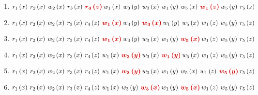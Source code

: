 \documentclass[a4paper]{article}
\begin{document}
\begin{enumerate}
		\item $r_{1}\left(x\right) \: r_{2}\left(x\right) \: w_{2}\left(x\right) \: r_{3}\left(x\right) \: \textcolor{Red3}{\boldsymbol{r_{4}\left(z\right)} \: }w_{1}\left(x\right) \: w_{3}\left(y\right) \: w_{3}\left(x\right) \: w_{1}\left(y\right) \: w_{5}\left(x\right) \: \textcolor{Red3}{\boldsymbol{w_{1}\left(z\right)} \: }w_{5}\left(y\right) \: r_{5}\left(z\right)$
		
		\item $r_{1}\left(x\right) \: r_{2}\left(x\right) \: w_{2}\left(x\right) \: r_{3}\left(x\right) \: r_{4}\left(z\right) \: \textcolor{Red3}{\boldsymbol{w_{1}\left(x\right)} \: }w_{3}\left(y\right) \: \textcolor{Red3}{\boldsymbol{w_{3}\left(x\right)} \: }w_{1}\left(y\right) \: w_{5}\left(x\right) \: w_{1}\left(z\right) \: w_{5}\left(y\right) \: r_{5}\left(z\right)$
		
		\item $r_{1}\left(x\right) \: r_{2}\left(x\right) \: w_{2}\left(x\right) \: r_{3}\left(x\right) \: r_{4}\left(z\right) \: \textcolor{Red3}{\boldsymbol{w_{1}\left(x\right)} \: }w_{3}\left(y\right) \: w_{3}\left(x\right) \: w_{1}\left(y\right) \: \textcolor{Red3}{\boldsymbol{w_{5}\left(x\right)} \: }w_{1}\left(z\right) \: w_{5}\left(y\right) \: r_{5}\left(z\right)$
		
		\item $r_{1}\left(x\right) \: r_{2}\left(x\right) \: w_{2}\left(x\right) \: r_{3}\left(x\right) \: r_{4}\left(z\right) \: w_{1}\left(x\right) \: \textcolor{Red3}{\boldsymbol{w_{3}\left(y\right)} \: }w_{3}\left(x\right) \: \textcolor{Red3}{\boldsymbol{w_{1}\left(y\right)} \: }w_{5}\left(x\right) \: w_{1}\left(z\right) \: w_{5}\left(y\right) \: r_{5}\left(z\right)$
		
		\item $r_{1}\left(x\right) \: r_{2}\left(x\right) \: w_{2}\left(x\right) \: r_{3}\left(x\right) \: r_{4}\left(z\right) \: w_{1}\left(x\right) \: \textcolor{Red3}{\boldsymbol{w_{3}\left(y\right)} \: }w_{3}\left(x\right) \: w_{1}\left(y\right) \: w_{5}\left(x\right) \: w_{1}\left(z\right) \: \textcolor{Red3}{\boldsymbol{w_{5}\left(y\right)} \: }r_{5}\left(z\right)$
		
		\item $r_{1}\left(x\right) \: r_{2}\left(x\right) \: w_{2}\left(x\right) \: r_{3}\left(x\right) \: r_{4}\left(z\right) \: w_{1}\left(x\right) \: w_{3}\left(y\right) \: \textcolor{Red3}{\boldsymbol{w_{3}\left(x\right)} \: }w_{1}\left(y\right) \: \textcolor{Red3}{\boldsymbol{w_{5}\left(x\right)} \: }w_{1}\left(z\right) \: w_{5}\left(y\right) \: r_{5}\left(z\right)$
		

\end{enumerate}
\end{document}
